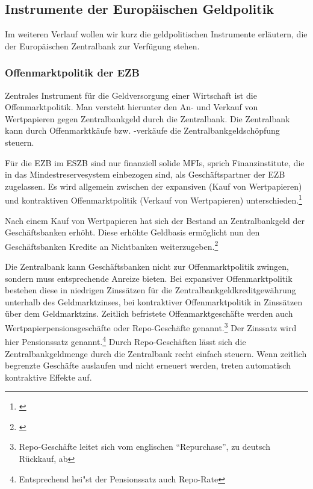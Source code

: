 \documentclass[
        onecolumn,
        a4paper,
        abstracton,
        parskip=half
        ,final
        ]{scrartcl}
\begin{document}
\subsection{Instrumente der Europ{\"a}ischen Geldpolitik}  %

Im weiteren Verlauf wollen wir kurz die geldpolitischen Instrumente erl{\"a}utern, die der Europ{\"a}ischen Zentralbank zur Verf{\"u}gung stehen.



\subsubsection{Offenmarktpolitik der EZB}  %

Zentrales Instrument f{\"u}r die Geldversorgung einer Wirtschaft ist die Offenmarktpolitik. Man versteht hierunter den An- und Verkauf von Wertpapieren gegen Zentralbankgeld durch die Zentralbank.
Die Zentralbank kann durch Offenmarktk{\"a}ufe bzw. -verk{\"a}ufe die Zentralbankgeldsch{\"o}pfung steuern.

F{\"u}r die EZB im \ac{ESZB} sind nur finanziell solide \ac{MFIs}, sprich Finanzinstitute, die in das Mindestreservesystem einbezogen sind, als Gesch{\"a}ftspartner der \ac{EZB} zugelassen. Es wird allgemein zwischen der expansiven (Kauf von Wertpapieren) und kontraktiven Offenmarktpolitik (Verkauf von Wertpapieren) unterschieden.\footnote[42]{\citep*[S.556]{Basseler2010}}

Nach einem Kauf von Wertpapieren hat sich der Bestand an Zentralbankgeld der Gesch{\"a}ftsbanken erh{\"o}ht. Diese erh{\"o}hte Geldbasis erm{\"o}glicht nun den Gesch{\"a}ftsbanken Kredite an Nichtbanken weiterzugeben.\footnote[43]{\citep*[S.557]{Basseler2010}}

Die Zentralbank kann Gesch{\"a}ftsbanken nicht zur Offenmarktpolitik zwingen, sondern muss entsprechende Anreize bieten. Bei expansiver Offenmarktpolitik bestehen diese in niedrigen Zinss{\"a}tzen f{\"u}r die Zentralbankgeldkreditgew{\"a}hrung unterhalb des Geldmarktzinses, bei kontraktiver Offenmarktpolitik in Zinss{\"a}tzen {\"u}ber dem Geldmarktzins.
Zeitlich befristete Offenmarktgesch{\"a}fte werden auch Wertpapierpensionsgesch{\"a}fte oder Repo-Gesch{\"a}fte genannt.\footnote[44]{Repo-Gesch{\"a}fte leitet sich vom englischen "`Repurchase"', zu deutsch R{\"u}ckkauf, ab} Der Zinssatz wird hier Pensionssatz genannt.\footnote[45]{Entsprechend hei{"s}t der Pensionssatz auch Repo-Rate}
Durch Repo-Gesch{\"a}ften l{\"a}sst sich die Zentralbankgeldmenge durch die Zentralbank recht einfach steuern. Wenn zeitlich begrenzte Gesch{\"a}fte auslaufen und nicht erneuert werden, treten automatisch kontraktive Effekte auf.
\end{document}
